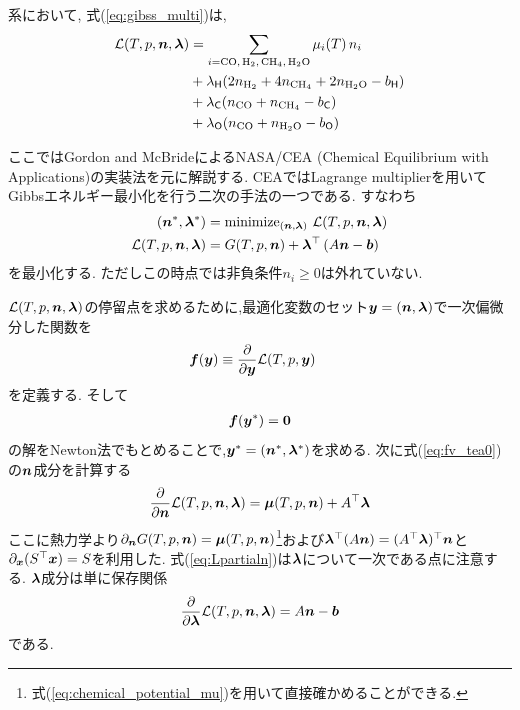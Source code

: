 系において, 式(\ref{eq:gibss_multi})は,
\begin{align}
    \mathcal{L}(T, p, \nv,\lambdav) &= \sum_{i = \ce{CO, H2, CH4, H2O}} \mu_i (T) \, n_i \nonumber \\ &+ \lambda_{\Hel} (2 n_{\ce{H2}} + 4 n_{\ce{CH4}} + 2 n_{\ce{H2O}} - b_\Hel) \nonumber \\
    &+ \lambda_{\Cel} (n_{\ce{CO}} + n_{\ce{CH4}} - b_\Cel) \nonumber \\ 
    &+  \lambda_{\Oel} ( n_{\ce{CO}} + n_{\ce{H2O}} - b_\Oel)
\end{align}

ここではGordon and McBrideによるNASA/CEA (Chemical Equilibrium with Applications)の実装法を元に解説する\cite{gordon1994computer,2024arXiv241207166G}. CEAではLagrange multiplierを用いてGibbsエネルギー最小化を行う二次の手法の一つである. すなわち
\begin{align}
    (\boldsymbol{n}^\ast, \boldsymbol{\lambda}^\ast)  &= \mathrm{minimize}_{(\boldsymbol{n},\boldsymbol{\lambda})} \,\, \mathcal{L}(T, p, \boldsymbol{n}, \boldsymbol{\lambda}) \\
    \mathcal{L}(T, p, \boldsymbol{n},\boldsymbol{\lambda}) &= G(T, p, \boldsymbol{n}) + \boldsymbol{\lambda}^\top \left(A \boldsymbol{n} - \boldsymbol{b}\right)  
\end{align}
を最小化する. ただしこの時点では非負条件$n_i \ge 0$は外れていない. 

$\mathcal{L}(T, p, \boldsymbol{n}, \boldsymbol{\lambda})$の停留点を求めるために,最適化変数のセット$\boldsymbol{y} = (\boldsymbol{n}, \boldsymbol{\lambda})$で一次偏微分した関数を
\begin{align}
\label{eq:fv_tea0}
    \boldsymbol{f}(\boldsymbol{y}) &\equiv \frac{\partial  }{\partial \boldsymbol{y}} \mathcal{L}(T, p, \boldsymbol{y}) 
\end{align}
を定義する. そして
\begin{align}
    \label{eq:fv_tea}
    \boldsymbol{f}(\boldsymbol{y}^\ast) = \boldsymbol{0}
\end{align}
の解をNewton法でもとめることで,$\boldsymbol{y}^\ast = (\boldsymbol{n}^\ast, \boldsymbol{\lambda}^\ast)$を求める. 次に式(\ref{eq:fv_tea0})の$\boldsymbol{n}$成分を計算する
\begin{align}
\label{eq:Lpartialn}
    \frac{\partial}{\partial \boldsymbol{n}}   \mathcal{L}(T, p, \boldsymbol{n}, \boldsymbol{\lambda}) =  \boldsymbol{\mu} (T, p, \boldsymbol{n}) + A^\top \boldsymbol{\lambda}  
\end{align}
ここに熱力学より$\partial_{\boldsymbol{n}} G(T, p, \boldsymbol{n}) =  \boldsymbol{\mu} (T, p, \boldsymbol{n})$\footnote{式(\ref{eq:chemical_potential_mu})を用いて直接確かめることができる. }および$\boldsymbol{\lambda}^\top (A \boldsymbol{n}) = (A^\top \boldsymbol{\lambda})^\top \boldsymbol{n}$と$\partial_{\boldsymbol{x}} (S^\top \boldsymbol{x}) = S$を利用した. 
式(\ref{eq:Lpartialn})は$\boldsymbol{\lambda}$について一次である点に注意する. $\boldsymbol{\lambda}$成分は単に保存関係
\begin{align}
\label{eq:Lpartiall}
\frac{\partial}{\partial \boldsymbol{\lambda}}  \mathcal{L}(T, p, \boldsymbol{n}, \boldsymbol{\lambda}) = A \boldsymbol{n} - \boldsymbol{b}  
\end{align}
である. 

